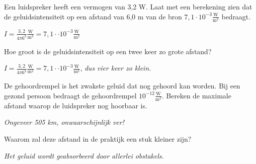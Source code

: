 \begin{werktekstoef}
\item{Een luidspreker heeft een vermogen van 3,2 W. Laat met een berekening zien dat de geluidsintensiteit op een afstand van 6,0 m
van de bron $7,1\cdot 10^{-3}\frac{\textrm{W}}{\textrm{m}^2}$ bedraagt.}

$I=\frac{3,2}{4\pi 6^2}\frac{\textrm{W}}{\textrm{m}^2}= 7,1\cdot·10^{-3}\frac{\textrm{W}}{\textrm{m}^2}$

\item{Hoe groot is de geluidsintensiteit op een twee keer zo grote afstand?}

$I=\frac{3,2}{4\pi 6^2}\frac{\textrm{W}}{\textrm{m}^2}= 7,1\cdot·10^{-3}\frac{\textrm{W}}{\textrm{m}^2}$, \emph{dus vier keer zo klein.}

 \item {De gehoordrempel is het zwakste geluid dat nog gehoord kan worden. Bij een gezond persoon bedraagt de gehoordrempel $10^{-12}\frac{\textrm{W}}{\textrm{m}^2}$.
 Bereken de maximale afstand waarop de luidspreker nog hoorbaar is.}
 
\emph{Ongeveer 505 km, onwaarschijnlijk ver!}
 
\item {Waarom zal deze afstand in de praktijk een stuk kleiner zijn?}

\emph{Het geluid wordt geabsorbeerd door allerlei obstakels.}
\end{werktekstoef}

